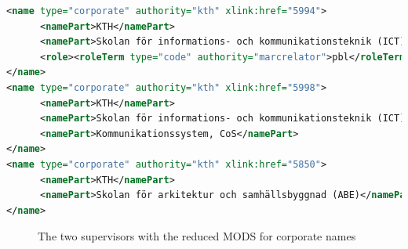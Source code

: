 \begin{lstlisting}[language={XML}, caption={Reduced MODS for corporate names more}, label=lst:reducedModesCorpNamesMore]
<name type="corporate" authority="kth" xlink:href="5994">
      <namePart>KTH</namePart>
      <namePart>Skolan för informations- och kommunikationsteknik (ICT)</namePart>
      <role><roleTerm type="code" authority="marcrelator">pbl</roleTerm></role>
</name>
<name type="corporate" authority="kth" xlink:href="5998">
      <namePart>KTH</namePart>
      <namePart>Skolan för informations- och kommunikationsteknik (ICT)</namePart>
      <namePart>Kommunikationssystem, CoS</namePart>
</name>
<name type="corporate" authority="kth" xlink:href="5850">
      <namePart>KTH</namePart>
      <namePart>Skolan för arkitektur och samhällsbyggnad (ABE)</namePart>
</name>
\end{lstlisting}
\clearpage

\begin{figure}[!ht]
  \begin{center}
  \end{center}
  \caption{The two supervisors with the reduced MODS for corporate names}
  \label{fig:twoSupervisorsReducedMODS}
\end{figure}

